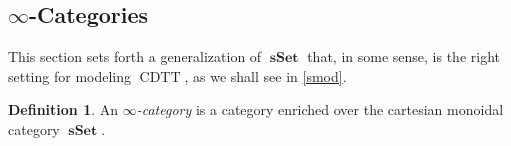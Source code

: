 \documentclass[10pt,letterpaper,cm]{nupset}
\theoremstyle{definition}
\newtheorem{definition}{Definition}[subsection]
\theoremstyle{theorem}
\newtheorem{prop}[definition]{Proposition}
\theoremstyle{remark}
\DeclareMathOperator{\mor}{Mor}
\newcommand{\0}{\mathbf{0}}
\newcommand{\1}{\mathbf{1}}
\newcommand{\2}{\mathbf{2}}
\DeclareMathOperator{\cdtt}{\mathrm{CDTT}}
\DeclareMathOperator{\sset}{\mathbf{sSet}}
\renewcommand{\c}{\mathscr{C}}
\DeclareMathOperator{\fib}{\mathnormal{Fib}}
\DeclareMathOperator{\cof}{\mathnormal{Cof}}
\DeclareMathOperator{\we}{\mathnormal{W}}
\newcommand{\be}{\begin{enumerate}}
\newcommand{\ee}{\end{enumerate}}
\begin{document}
\subsection{$\infty$-Categories}\label{highcat}

This section sets forth a  generalization of $\sset$ that, in some sense, is the right setting for modeling $\cdtt$, as we shall see 
in \cref{smod}.

\medskip

\begin{comment}
\begin{definition} Let $\c$ be a category and let $J$ be a subclass of $\mor(\c)$.
\be
\item We say that $J$ satisfies \textit{two-out-of-six} if for any three composable maps
\[
A \overset{f}{\longrightarrow} B \overset{g}{\longrightarrow} C \overset{h}{\longrightarrow} D
\] in $J$, whenever both $h \circ g$ and $g\circ f$ are in $J$, so are $f$, $g$, $h$, and $h \circ g \circ f$.
\item We say that $\c$ is a \textit{homotopical category} if it has a distinguished class $\we$ of morphisms (called \textit{weak equivalences}) that both contains all isomorphisms and satisfies two-out-of-six.
\ee
\end{definition}

\begin{prop}
If $\left(\c, \fib, \cof, \we\right)$ is a model category, then $\left(\c, \we\right)$ is a homotopical category.\footnote{See \cite{MSER}.}
\end{prop}

Moreover, it is clear that every homotopical category is a category with weak equivalences. Therefore, the notion of homotopical category  is intermediate between \textit{category with weak equivalences} and \textit{model category}.

\smallskip
\end{comment}

\begin{definition}
An  \textit{$\infty$-category} is a category  enriched over the cartesian monoidal category $\sset$.
\end{definition}
\end{document}
